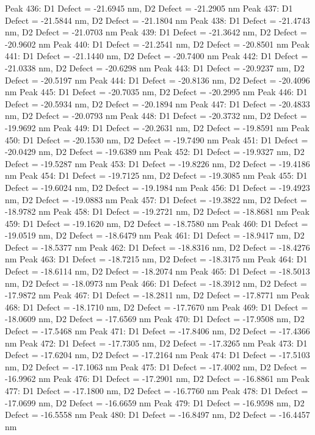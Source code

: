 \documentclass{article}
\begin{document}
Peak 436: D1 Defect = -21.6945 nm, D2 Defect = -21.2905 nm
Peak 437: D1 Defect = -21.5844 nm, D2 Defect = -21.1804 nm
Peak 438: D1 Defect = -21.4743 nm, D2 Defect = -21.0703 nm
Peak 439: D1 Defect = -21.3642 nm, D2 Defect = -20.9602 nm
Peak 440: D1 Defect = -21.2541 nm, D2 Defect = -20.8501 nm
Peak 441: D1 Defect = -21.1440 nm, D2 Defect = -20.7400 nm
Peak 442: D1 Defect = -21.0338 nm, D2 Defect = -20.6298 nm
Peak 443: D1 Defect = -20.9237 nm, D2 Defect = -20.5197 nm
Peak 444: D1 Defect = -20.8136 nm, D2 Defect = -20.4096 nm
Peak 445: D1 Defect = -20.7035 nm, D2 Defect = -20.2995 nm
Peak 446: D1 Defect = -20.5934 nm, D2 Defect = -20.1894 nm
Peak 447: D1 Defect = -20.4833 nm, D2 Defect = -20.0793 nm
Peak 448: D1 Defect = -20.3732 nm, D2 Defect = -19.9692 nm
Peak 449: D1 Defect = -20.2631 nm, D2 Defect = -19.8591 nm
Peak 450: D1 Defect = -20.1530 nm, D2 Defect = -19.7490 nm
Peak 451: D1 Defect = -20.0429 nm, D2 Defect = -19.6389 nm
Peak 452: D1 Defect = -19.9327 nm, D2 Defect = -19.5287 nm
Peak 453: D1 Defect = -19.8226 nm, D2 Defect = -19.4186 nm
Peak 454: D1 Defect = -19.7125 nm, D2 Defect = -19.3085 nm
Peak 455: D1 Defect = -19.6024 nm, D2 Defect = -19.1984 nm
Peak 456: D1 Defect = -19.4923 nm, D2 Defect = -19.0883 nm
Peak 457: D1 Defect = -19.3822 nm, D2 Defect = -18.9782 nm
Peak 458: D1 Defect = -19.2721 nm, D2 Defect = -18.8681 nm
Peak 459: D1 Defect = -19.1620 nm, D2 Defect = -18.7580 nm
Peak 460: D1 Defect = -19.0519 nm, D2 Defect = -18.6479 nm
Peak 461: D1 Defect = -18.9417 nm, D2 Defect = -18.5377 nm
Peak 462: D1 Defect = -18.8316 nm, D2 Defect = -18.4276 nm
Peak 463: D1 Defect = -18.7215 nm, D2 Defect = -18.3175 nm
Peak 464: D1 Defect = -18.6114 nm, D2 Defect = -18.2074 nm
Peak 465: D1 Defect = -18.5013 nm, D2 Defect = -18.0973 nm
Peak 466: D1 Defect = -18.3912 nm, D2 Defect = -17.9872 nm
Peak 467: D1 Defect = -18.2811 nm, D2 Defect = -17.8771 nm
Peak 468: D1 Defect = -18.1710 nm, D2 Defect = -17.7670 nm
Peak 469: D1 Defect = -18.0609 nm, D2 Defect = -17.6569 nm
Peak 470: D1 Defect = -17.9508 nm, D2 Defect = -17.5468 nm
Peak 471: D1 Defect = -17.8406 nm, D2 Defect = -17.4366 nm
Peak 472: D1 Defect = -17.7305 nm, D2 Defect = -17.3265 nm
Peak 473: D1 Defect = -17.6204 nm, D2 Defect = -17.2164 nm
Peak 474: D1 Defect = -17.5103 nm, D2 Defect = -17.1063 nm
Peak 475: D1 Defect = -17.4002 nm, D2 Defect = -16.9962 nm
Peak 476: D1 Defect = -17.2901 nm, D2 Defect = -16.8861 nm
Peak 477: D1 Defect = -17.1800 nm, D2 Defect = -16.7760 nm
Peak 478: D1 Defect = -17.0699 nm, D2 Defect = -16.6659 nm
Peak 479: D1 Defect = -16.9598 nm, D2 Defect = -16.5558 nm
Peak 480: D1 Defect = -16.8497 nm, D2 Defect = -16.4457 nm
\end{document}
